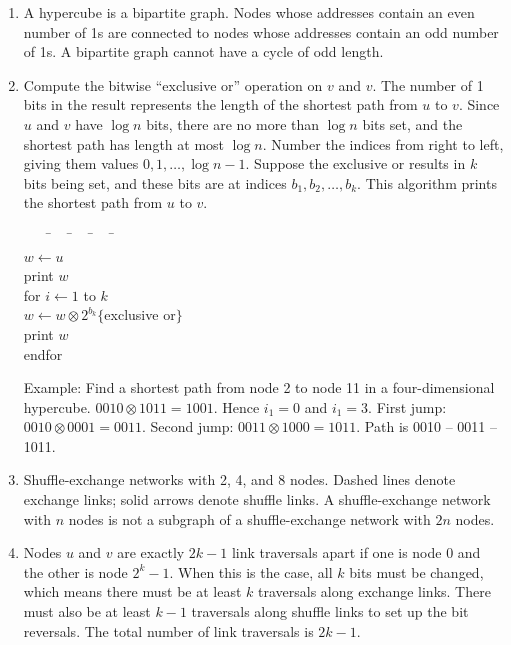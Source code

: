 \begin{enumerate}
\item  A hypercube is a bipartite graph. Nodes whose addresses contain an
       even number of 1s are connected to nodes whose addresses contain an
       odd number of 1s. A bipartite graph cannot have a cycle of odd length.

\item  Compute the bitwise ``exclusive or'' operation on $v$ and $v$.
       The number of 1 bits in the result represents the length of the
       shortest path from $u$ to $v$. Since $u$ and $v$ have $\log n$ bits,
       there are no more than $\log n$ bits set, and
       the shortest path has length at most $\log n$.
       Number the indices from right to left, giving them values
       $0, 1, \ldots, \log n - 1$.
       Suppose the exclusive or results in $k$ bits being set, and
       these bits are at indices $b_1, b_2, \ldots, b_k$.
       This algorithm prints the shortest path from  $u$ to $v$.
       \begin{tabbing}
       \ \ \ \=\ \ \ \=\ \ \ \=\ \ \ \=\ \ \ \=\\
       $w \leftarrow u$\\
       print $w$\\
       for $i \leftarrow 1$ to $k$\\
       \> $w \leftarrow w \otimes 2^{b_k}$\quad\quad\quad$\{$exclusive or$\}$\\
       \> print $w$\\
       endfor\\
       \end{tabbing}

       Example: Find a shortest path from node 2 to node 11 in a
       four-dimensional hypercube. $0010 \otimes 1011 = 1001$.
       Hence $i_1 = 0$ and  $i_1 = 3$.  First jump:
       $0010 \otimes 0001 = 0011$. Second jump: $0011 \otimes 1000 = 1011$.
       Path is 0010 -- 0011 -- 1011.

\item  Shuffle-exchange networks with 2, 4, and 8 nodes.
       Dashed lines denote exchange links;
       solid arrows denote shuffle links.
       A shuffle-exchange network with $n$ nodes is not a subgraph of
       a shuffle-exchange network with $2n$ nodes.

       \begin{center}
       \end{center}

\item  Nodes $u$ and $v$ are exactly $2k-1$ link traversals apart if 
       one is node 0 and the other is node $2^k-1$.
       When this is the case, all $k$ bits must be changed, which means
       there must be at least $k$ traversals along exchange links.
       There must also be at least $k-1$ traversals along shuffle links
       to set up the bit reversals. The total number of link traversals
       is $2k-1$.


\end{enumerate}
